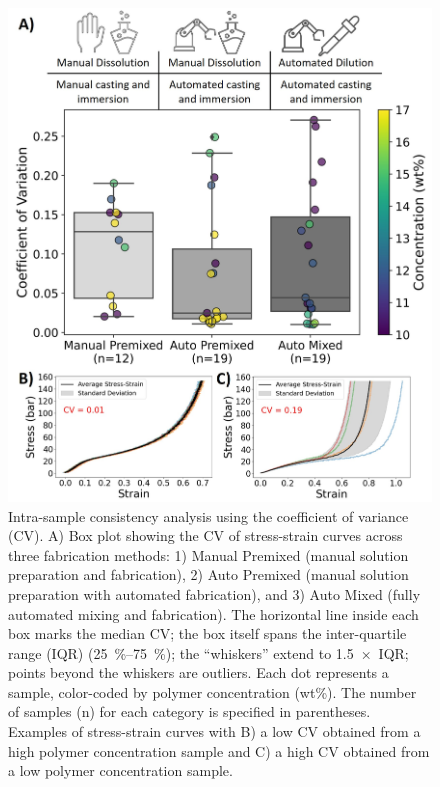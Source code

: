 \documentclass[preprint,12pt,times]{elsarticle}
\begin{document}
\begin{figure}[!ht]
\centering
\includegraphics[width=\linewidth]{consistency-with-label.jpg}
\caption{Intra-sample consistency analysis using the coefficient of variance (CV). A) Box plot showing the CV of stress-strain curves across three fabrication methods: 1) Manual Premixed (manual solution preparation and fabrication), 2) Auto Premixed (manual solution preparation with automated fabrication), and 3) Auto Mixed (fully automated mixing and fabrication). The horizontal line inside each box marks the median CV; the box itself spans the inter-quartile range (IQR) (25~\%--75~\%); the “whiskers” extend to 1.5~×~IQR; points beyond the whiskers are outliers. Each dot represents a sample, color-coded by polymer concentration (wt\%). The number of samples (n) for each category is specified in parentheses. Examples of stress-strain curves with B) a low CV obtained from a high polymer concentration sample and C) a high CV obtained from a low polymer concentration sample.}
\label{consistency-with-label.jpg}
\end{figure}
\end{document}
